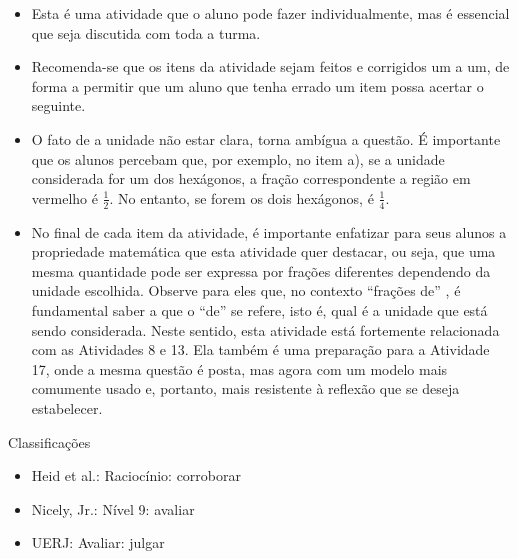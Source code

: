 \begin{multicols}{2}
\begin{itemize} %
    \item       Esta é uma atividade que o aluno pode fazer individualmente, mas é essencial que seja discutida com toda a turma.
    \item       Recomenda-se que os itens da atividade sejam feitos e corrigidos um a um, de forma a permitir que um aluno que tenha errado um item possa acertar o seguinte.
    \item       O fato de a unidade não estar clara, torna ambígua a questão. É importante que os alunos percebam que, por exemplo, no item a), se a unidade considerada for um dos hexágonos, a fração correspondente a região em vermelho é $\frac{1}{2}$. No entanto, se forem os dois hexágonos, é $\frac{1}{4}$.
    \item       No final de cada item da atividade, é importante enfatizar para seus alunos a propriedade matemática que esta atividade quer destacar, ou seja, que uma mesma quantidade pode ser expressa por frações diferentes dependendo da unidade escolhida. Observe para eles que, no contexto       ``frações de''      , é fundamental saber a que o       ``de''       se refere, isto é, qual é a unidade que está sendo considerada. Neste sentido, esta atividade está fortemente relacionada com as Atividades 8 e 13. Ela também é uma preparação para a Atividade 17, onde a mesma questão é posta, mas agora com um modelo mais comumente usado e, portanto, mais resistente à reflexão que se deseja estabelecer.
\end{itemize} %


  Classificações
\begin{itemize} %
    \item       Heid et al.: Raciocínio: corroborar
    \item       Nicely, Jr.: Nível 9: avaliar
    \item       UERJ: Avaliar: julgar
\end{itemize} %

\def \tripinha{ (30:4) -- (90:4) -- (150:4)--(210:4)--(270:4)--(330:4) [shift={({4*sqrt(3)},0)}] --(270:4) -- (330:4) -- (30:4) -- (90:4)--(150:4)--cycle;}


\def \tripa{ (30:4) -- (90:4) -- (150:4)--(210:4)--(270:4)--(330:4) [shift={({4*sqrt(3)},0)}] --(270:4) -- (330:4) [shift={({4*sqrt(3)},0)}]--  (270:4) -- (330:4) -- (30:4) -- (90:4)--(150:4) [shift={({-4*sqrt(3)},0)}] -- (90:4) -- (150:4)--cycle;}

\def \tripalonga{ (30:4) -- (90:4) -- (150:4)--(210:4)--(270:4)--(330:4) [shift={({4*sqrt(3)},0)}] --(270:4) -- (330:4) [shift={({4*sqrt(3)},0)}] --(270:4) -- (330:4)[shift={({4*sqrt(3)},0)}] --(270:4) -- (330:4) [shift={({4*sqrt(3)},0)}]--  (270:4) -- (330:4) -- (30:4) -- (90:4)--(150:4) [shift={({-4*sqrt(3)},0)}] -- (90:4) -- (150:4)[shift={({-4*sqrt(3)},0)}] -- (90:4) -- (150:4) [shift={({-4*sqrt(3)},0)}] -- (90:4) -- (150:4)--cycle;}


\end{multicols}

